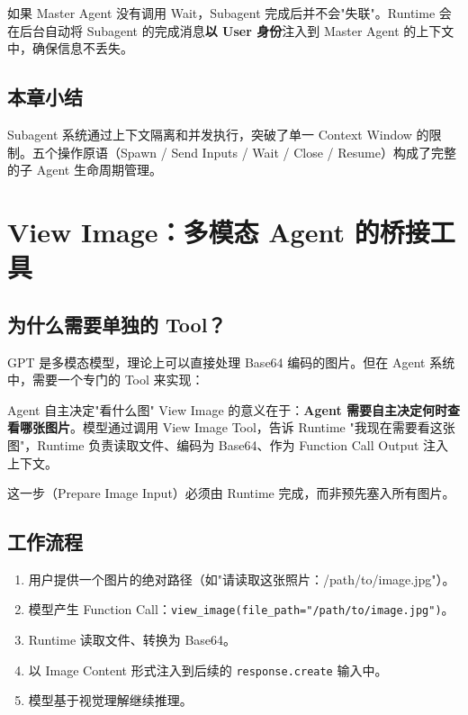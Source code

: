\documentclass[a4paper]{article}
\begin{document}
如果 Master Agent 没有调用 Wait，Subagent 完成后并不会"失联"。Runtime 会在后台自动将 Subagent 的完成消息\textbf{以 User 身份}注入到 Master Agent 的上下文中，确保信息不丢失。

\subsection{本章小结}

Subagent 系统通过上下文隔离和并发执行，突破了单一 Context Window 的限制。五个操作原语（Spawn / Send Inputs / Wait / Close / Resume）构成了完整的子 Agent 生命周期管理。


\section{View Image：多模态 Agent 的桥接工具}

\subsection{为什么需要单独的 Tool？}

GPT 是多模态模型，理论上可以直接处理 Base64 编码的图片。但在 Agent 系统中，需要一个专门的 Tool 来实现：

\begin{knowledgebox}{Agent 自主决定"看什么图"}
View Image 的意义在于：\textbf{Agent 需要自主决定何时查看哪张图片}。模型通过调用 View Image Tool，告诉 Runtime "我现在需要看这张图"，Runtime 负责读取文件、编码为 Base64、作为 Function Call Output 注入上下文。

这一步（Prepare Image Input）必须由 Runtime 完成，而非预先塞入所有图片。
\end{knowledgebox}

\subsection{工作流程}

\begin{enumerate}
    \item 用户提供一个图片的绝对路径（如"请读取这张照片：/path/to/image.jpg"）。
    \item 模型产生 Function Call：\texttt{view\_image(file\_path="/path/to/image.jpg")}。
    \item Runtime 读取文件、转换为 Base64。
    \item 以 Image Content 形式注入到后续的 \texttt{response.create} 输入中。
    \item 模型基于视觉理解继续推理。
\end{enumerate}
\end{document}

